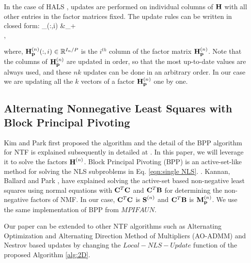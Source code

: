 In the case of HALS \cite{CP2009}, updates are performed on individual columns of $\mathbf{H}$ with all other entries in the factor matrices fixed.
The update rules \cite[Algorithm 2]{CP2009} can be written in closed form:
\SplitN{\label{eqn:halsupdate}} {
_{}(:,i) &\leftarrow \lt[ \Mn{H}{n}_{\V{p}}(:,i) + \Mn{M}{n}_{\V{p}}(:,i) - (\Mn{H}{n}_{\V{p}} \Mn{S}{n})(:,i)  \rt]_+\\
}, 

where, $\Mn{H}{n}_{\V{p}}(:,i) \in \Rn{I_n/P}$ is the $i^{th}$ column of the factor matrix $\Mn{H}{n}_{\V{p}}$.
Note that the columns of $\Mn{H}{n}_{\V{p}}$ are updated in order, so that the most up-to-date values are always used, and these $nk$ updates can be done in an arbitrary order.  In our case we are updating all the $k$ vectors of a factor $\Mn{H}{n}_{\V{p}}$ one by one. 

\subsection{Alternating Nonnegative Least Squares with Block Principal Pivoting}
\label{sec:BPP}

Kim and Park \cite{KP2011} first proposed the algorithm and the detail of the BPP algorithm for NTF is explained subsequently in detailed at \cite{KHP2014}. In this paper, we will leverage it to solve the factors $\Mn{H}{n}$. 
Block Principal Pivoting (BPP) is an active-set-like method for solving the NLS subproblems in Eq. \eqref{eqn:single NLS}.
. 
Kannan, Ballard and Park \cite{KBP2018}, have explained solving the active-set based non-negative least squares 
using normal equations with $\mathbf{C}^T\mathbf{C}$ and $\mathbf{C}^T\mathbf{B}$ for determining the non-negative factors of NMF. 
In our case, $\mathbf{C}^T\mathbf{C}$ is $\Mn{S}{n}$ and $\mathbf{C}^T\mathbf{B}$ is $\Mn{M}{n}_{\V{p}}$. We use the same implementation
of BPP from $MPIFAUN$.

Our paper can be extended to other NTF algorithms such as Alternating Optimization and Alternating Direction Method of Multipliers (AO-ADMM) \cite{HSL2015, SBK2017} and Nestrov based updates
\cite{LKLHS2017} by changing the $Local-NLS-Update$ function of the proposed Algorithm \ref{alg:2D}. 